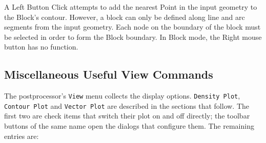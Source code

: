 \documentclass[12pt]{report}
\begin{document}
A Left Button Click attempts to add the nearest Point in the input
geometry to the Block's contour.  However, a block can only be
defined along line and arc segments from the input geometry.  Each
node on the boundary of the block must be selected in order to form
the Block boundary.  In Block mode, the Right mouse button has no
function.

\subsection{Miscellaneous Useful View Commands} \label{scissors}

The postprocessor's {\tt View} menu collects the display options.
{\tt Density Plot}, {\tt Contour Plot} and {\tt Vector Plot} are described in
the sections that follow.  The first two are check items that switch their
plot on and off directly; the toolbar buttons of the same name open the
dialogs that configure them.  The remaining entries are:
\end{document}
